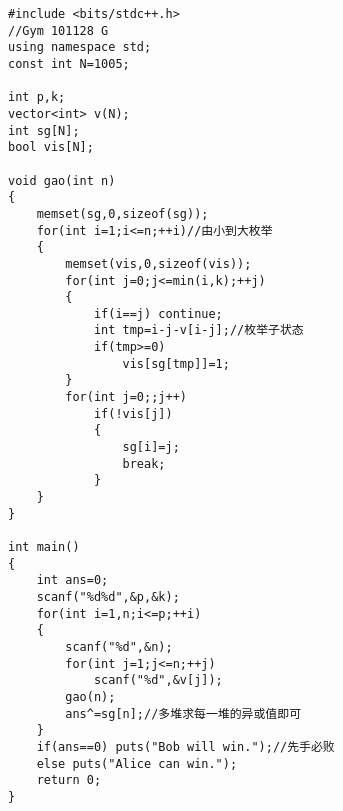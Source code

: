 ﻿\begin{lstlisting}
#include <bits/stdc++.h>
//Gym 101128 G
using namespace std;
const int N=1005;

int p,k;
vector<int> v(N);
int sg[N];
bool vis[N];

void gao(int n)
{
	memset(sg,0,sizeof(sg));
	for(int i=1;i<=n;++i)//由小到大枚举
	{
		memset(vis,0,sizeof(vis));
		for(int j=0;j<=min(i,k);++j)
		{
			if(i==j) continue;
			int tmp=i-j-v[i-j];//枚举子状态
			if(tmp>=0)
				vis[sg[tmp]]=1;
		}
		for(int j=0;;j++)
			if(!vis[j])
			{
				sg[i]=j;
				break;
			}
	}
}

int main()
{
	int ans=0;
	scanf("%d%d",&p,&k);
	for(int i=1,n;i<=p;++i)
	{
		scanf("%d",&n);
		for(int j=1;j<=n;++j)
			scanf("%d",&v[j]);
		gao(n);
		ans^=sg[n];//多堆求每一堆的异或值即可
	}
	if(ans==0) puts("Bob will win.");//先手必败
	else puts("Alice can win.");
	return 0;
}
\end{lstlisting}